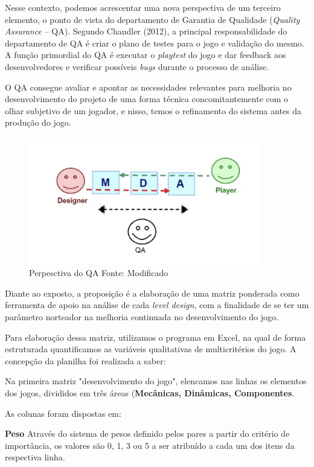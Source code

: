 \documentclass[12pt, onecolumn]{IEEEtran}
\begin{document}
Nesse contexto, podemos acrescentar uma nova perspectiva de um terceiro elemento, o ponto de vista do departamento de Garantia de Qualidade  (\textit{Quality Assurance} – QA). Segundo Chandler (2012), a principal responsabilidade do departamento de QA é criar o plano de testes para o jogo e validação do mesmo. A função primordial do QA é executar o \textit{playtest} do jogo e dar feedback aos desenvolvedores e verificar possíveis \textit{bugs} durante o processo de análise\cite{b24}.

O QA consegue avaliar e apontar as necessidades relevantes para melhoria no desenvolvimento do projeto de uma forma técnica concomitantemente com o olhar subjetivo de um jogador, e nisso, temos o refinamento do sistema antes da produção do jogo.

\begin{figure}[H]
    \centering
    \includegraphics[width=0.9\textwidth]{imagens/conclusao-2.png}
    \caption{Perpesctiva do QA Fonte: Modificado\cite{b23}}
    \label{fig:mesh1}
\end{figure}

Diante ao exposto, a proposição é a elaboração de uma matriz ponderada como  ferramenta de apoio na análise de cada \textit{level design}, com a finalidade de se ter um parâmetro norteador na melhoria continuada no  desenvolvimento do jogo.
 
Para elaboração dessa matriz, utilizamos o programa em Excel, na qual de forma estruturada quantificamos as variáveis qualitativas de multicritérios do jogo. A  concepção da planilha foi realizada a saber:

Na primeira matriz "desenvolvimento do jogo", elencamos nas linhas os elementos dos jogos, divididos em três áreas (\textbf{Mecânicas, Dinâmicas, Componentes}. 

As colunas foram dispostas em:

\textbf{Peso}
Através do sistema de  pesos definido pelos pares a partir do critério de importância, os valores são 0, 1, 3 ou 5  a ser atribuído a cada um dos itens da respectiva linha. 
\end{document}
